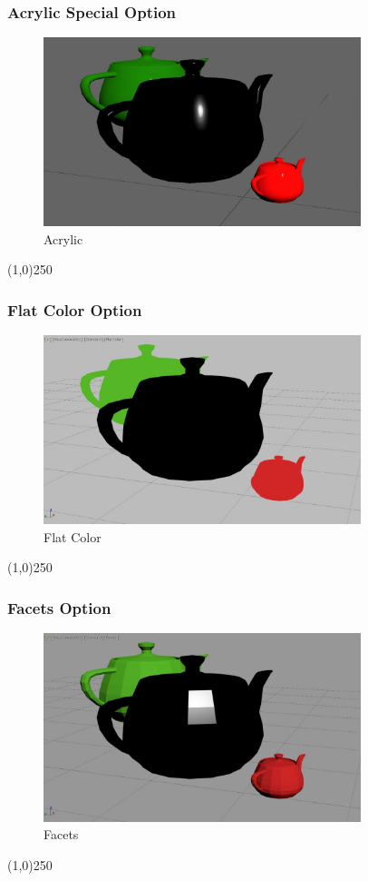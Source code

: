 \begin{frame}
\frametitle{Acrylic Special Option}
\begin{figure}
	\centering
	\includegraphics[height=5.5cm]{img/ViewportOptions/Acrylic.jpg}
	\caption{Acrylic}
	\label{fig:AcrylicOption}
\end{figure}
\end{frame}
\begin{center}\line(1,0){250}\end{center}



\begin{frame}
\frametitle{Flat Color Option}
\begin{figure}
	\centering
	\includegraphics[height=5.5cm]{img/ViewportOptions/FlatColor.jpg}
	\caption{Flat Color}
	\label{fig:FlatColorOption}
\end{figure}
\end{frame}
\begin{center}\line(1,0){250}\end{center}



\begin{frame}
\frametitle{Facets Option}
\begin{figure}
	\centering
	\includegraphics[height=5.5cm]{img/ViewportOptions/Facets.jpg}
	\caption{Facets}
	\label{fig:Facets}
\end{figure}
\end{frame}
\begin{center}\line(1,0){250}\end{center}



